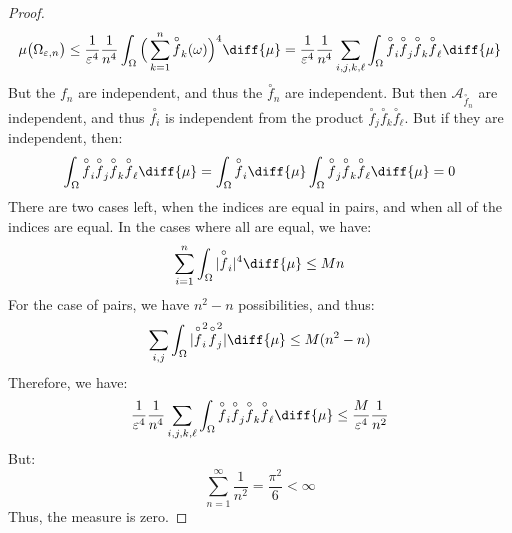 \begin{proof}
        \begin{equation}
            \mu\big(\Omega_{\varepsilon,n}\big)
            \leq\frac{1}{\varepsilon^{4}}\frac{1}{n^{4}}
            \int_{\Omega}\Big(\sum_{k=1}^{n}
            \overset{\circ}{f}_{k}(\omega)\Big)^{4}\diff{\mu}
            =\frac{1}{\varepsilon^{4}}\frac{1}{n^{4}}
            \sum_{i,j,k,\ell}\int_{\Omega}
            \overset{\circ}{f}_{i}\overset{\circ}{f}_{j}
            \overset{\circ}{f}_{k}\overset{\circ}{f}_{\ell}
            \diff{\mu}
        \end{equation}
        But the $f_{n}$ are independent, and thus the
        $\overset{\circ}{f}_{n}$ are independent. But then
        $\mathcal{A}_{\overset{\circ}{f}_{n}}$ are independent,
        and thus $\overset{\circ}{f_{i}}$ is independent
        from the product
        $\overset{\circ}{f}_{j}\overset{\circ}{f}_{k}\overset{\circ}{f}_{\ell}$. But if they are independent, then:
        \begin{equation}
            \int_{\Omega}
            \overset{\circ}{f}_{i}\overset{\circ}{f}_{j}
            \overset{\circ}{f}_{k}\overset{\circ}{f}_{\ell}
            \diff{\mu}=
            \int_{\Omega}
            \overset{\circ}{f}_{i}\diff{\mu}
            \int_{\Omega}\overset{\circ}{f}_{j}
            \overset{\circ}{f}_{k}\overset{\circ}{f}_{\ell}
            \diff{\mu}=0
        \end{equation}
        There are two cases left, when the indices are equal
        in pairs, and when all of the indices are equal. In
        the cases where all are equal, we have:
        \begin{equation}
            \sum_{i=1}^{n}
            \int_{\Omega}
            |\overset{\circ}{f}_{i}|^{4}\diff{\mu}
            \leq{M}n
        \end{equation}
        For the case of pairs, we have $n^{2}-n$ possibilities,
        and thus:
        \begin{equation}
            \sum_{i,j}\int_{\Omega}
            |\overset{\circ}{f}_{i}^{2}
            \overset{\circ}{f}_{j}^{2}|\diff{\mu}
            \leq{M}(n^{2}-n)
        \end{equation}
        Therefore, we have:
        \begin{equation}
            \frac{1}{\varepsilon^{4}}\frac{1}{n^{4}}
            \sum_{i,j,k,\ell}\int_{\Omega}
            \overset{\circ}{f}_{i}\overset{\circ}{f}_{j}
            \overset{\circ}{f}_{k}\overset{\circ}{f}_{\ell}
            \diff{\mu}
            \leq\frac{M}{\varepsilon^{4}}
            \frac{1}{n^{2}}
        \end{equation}
        But:
        \begin{equation}
            \sum_{n=1}^{\infty}\frac{1}{n^{2}}
            =\frac{\pi^{2}}{6}<\infty
        \end{equation}
        Thus, the measure is zero.
    \end{proof}
